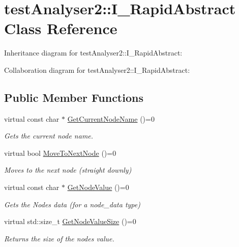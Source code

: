 \hypertarget{classtestAnalyser2_1_1I__RapidAbstract}{}\section{test\+Analyser2\+::I\+\_\+\+Rapid\+Abstract Class Reference}
\label{classtestAnalyser2_1_1I__RapidAbstract}


Inheritance diagram for test\+Analyser2\+::I\+\_\+\+Rapid\+Abstract\+:


Collaboration diagram for test\+Analyser2\+::I\+\_\+\+Rapid\+Abstract\+:
\subsection*{Public Member Functions}
\begin{DoxyCompactItemize}
\item 
virtual const char $\ast$ \mbox{\hyperlink{classtestAnalyser2_1_1I__RapidAbstract_af94009549a9590806e5d8164ebca3c15}{Get\+Current\+Node\+Name}} ()=0
\begin{DoxyCompactList}\small\item\em Gets the current node name. \end{DoxyCompactList}\item 
virtual bool \mbox{\hyperlink{classtestAnalyser2_1_1I__RapidAbstract_a95d6bb9f515adb49e62396e48d23d88f}{Move\+To\+Next\+Node}} ()=0
\begin{DoxyCompactList}\small\item\em Moves to the next node (straight downly) \end{DoxyCompactList}\item 
virtual const char $\ast$ \mbox{\hyperlink{classtestAnalyser2_1_1I__RapidAbstract_a0d4dd17120e75549ee68181cc4a4e503}{Get\+Node\+Value}} ()=0
\begin{DoxyCompactList}\small\item\em Gets the Node\textquotesingle{}s data (for a node\+\_\+data type) \end{DoxyCompactList}\item 
virtual std\+::size\+\_\+t \mbox{\hyperlink{classtestAnalyser2_1_1I__RapidAbstract_ad30a0a18d8a387ab48c95270b70042b4}{Get\+Node\+Value\+Size}} ()=0
\begin{DoxyCompactList}\small\item\em Returns the size of the nodes value. \end{DoxyCompactList}\item 

\end{DoxyCompactItemize}
